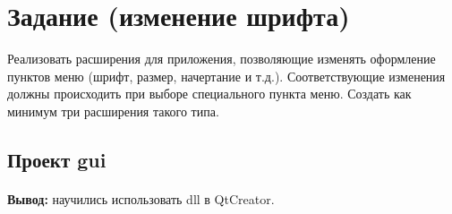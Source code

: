 
\newpage

\section{Задание (изменение шрифта)}

Реализовать расширения для приложения, позволяющие изменять оформление пунктов меню
(шрифт, размер, начертание и т.д.).
Соответствующие изменения должны происходить при выборе специального пункта меню.
Создать как минимум три расширения такого типа.

\subsection{Проект gui}



\paragraph{} \hspace{0pt}

\textbf{Вывод:} научились использовать dll в QtCreator.
